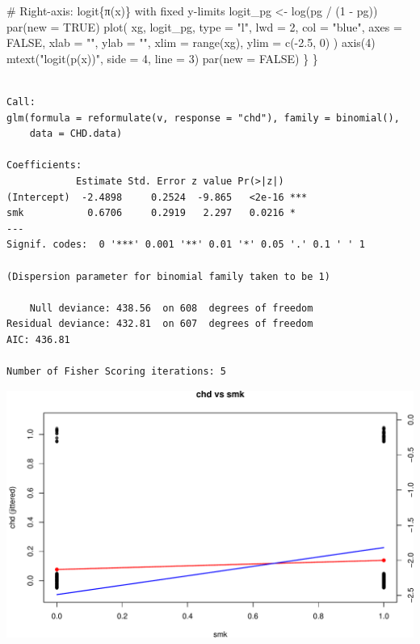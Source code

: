 \documentclass[
  letterpaper,
]{scrbook}
\newenvironment{Shaded}{\begin{snugshade}}{\end{snugshade}}
\newcommand{\AttributeTok}[1]{\textcolor[rgb]{0.40,0.45,0.13}{#1}}
\newcommand{\CommentTok}[1]{\textcolor[rgb]{0.37,0.37,0.37}{#1}}
\newcommand{\ConstantTok}[1]{\textcolor[rgb]{0.56,0.35,0.01}{#1}}
\newcommand{\DecValTok}[1]{\textcolor[rgb]{0.68,0.00,0.00}{#1}}
\newcommand{\FloatTok}[1]{\textcolor[rgb]{0.68,0.00,0.00}{#1}}
\newcommand{\FunctionTok}[1]{\textcolor[rgb]{0.28,0.35,0.67}{#1}}
\newcommand{\NormalTok}[1]{\textcolor[rgb]{0.00,0.23,0.31}{#1}}
\newcommand{\OtherTok}[1]{\textcolor[rgb]{0.00,0.23,0.31}{#1}}
\newcommand{\SpecialCharTok}[1]{\textcolor[rgb]{0.37,0.37,0.37}{#1}}
\newcommand{\StringTok}[1]{\textcolor[rgb]{0.13,0.47,0.30}{#1}}
\begin{document}
\begin{Shaded}
\begin{Highlighting}[]
    \CommentTok{\# Right{-}axis: logit\{π(x)\} with fixed y{-}limits}
\NormalTok{    logit\_pg }\OtherTok{\textless{}{-}} \FunctionTok{log}\NormalTok{(pg }\SpecialCharTok{/}\NormalTok{ (}\DecValTok{1} \SpecialCharTok{{-}}\NormalTok{ pg))}
    \FunctionTok{par}\NormalTok{(}\AttributeTok{new =} \ConstantTok{TRUE}\NormalTok{)}
    \FunctionTok{plot}\NormalTok{(}
\NormalTok{      xg, logit\_pg, }\AttributeTok{type =} \StringTok{"l"}\NormalTok{, }\AttributeTok{lwd =} \DecValTok{2}\NormalTok{, }\AttributeTok{col =} \StringTok{"blue"}\NormalTok{,}
      \AttributeTok{axes =} \ConstantTok{FALSE}\NormalTok{, }\AttributeTok{xlab =} \StringTok{""}\NormalTok{, }\AttributeTok{ylab =} \StringTok{""}\NormalTok{,}
      \AttributeTok{xlim =} \FunctionTok{range}\NormalTok{(xg), }\AttributeTok{ylim =} \FunctionTok{c}\NormalTok{(}\SpecialCharTok{{-}}\FloatTok{2.5}\NormalTok{, }\DecValTok{0}\NormalTok{)}
\NormalTok{    )}
    \FunctionTok{axis}\NormalTok{(}\DecValTok{4}\NormalTok{)}
    \FunctionTok{mtext}\NormalTok{(}\StringTok{"logit(p(x))"}\NormalTok{, }\AttributeTok{side =} \DecValTok{4}\NormalTok{, }\AttributeTok{line =} \DecValTok{3}\NormalTok{)}
    \FunctionTok{par}\NormalTok{(}\AttributeTok{new =} \ConstantTok{FALSE}\NormalTok{)}
\NormalTok{  \}}
\NormalTok{\}}
\end{Highlighting}
\end{Shaded}

\begin{verbatim}

Call:
glm(formula = reformulate(v, response = "chd"), family = binomial(), 
    data = CHD.data)

Coefficients:
            Estimate Std. Error z value Pr(>|z|)    
(Intercept)  -2.4898     0.2524  -9.865   <2e-16 ***
smk           0.6706     0.2919   2.297   0.0216 *  
---
Signif. codes:  0 '***' 0.001 '**' 0.01 '*' 0.05 '.' 0.1 ' ' 1

(Dispersion parameter for binomial family taken to be 1)

    Null deviance: 438.56  on 608  degrees of freedom
Residual deviance: 432.81  on 607  degrees of freedom
AIC: 436.81

Number of Fisher Scoring iterations: 5
\end{verbatim}

\includegraphics{unit4-lr/logistic_files/figure-pdf/chd-univariate-2x2-jitter-fixedlogit-1.pdf}
\end{document}

